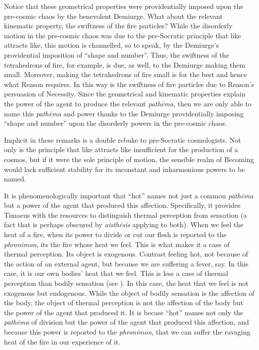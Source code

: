 Notice that these geometrical properties were providentially imposed upon the pre-cosmic chaos by the benevolent Demiurge. What about the relevant kinematic property, the swiftness of the fire particles? While the disorderly motion in the pre-cosmic chaos was due to the pre-Socratic principle that like attracts like, this motion is channelled, so to speak, by the Demiurge's providential imposition of ``shape and number''. Thus, the swiftness of the tetrahedrons of fire, for example, is due, as well, to the Demiurge making them small. Moreover, making the tetrahedrons of fire small is for the best and hence what Reason requires. In this way is the swiftness of fire particles due to Reason's persuasion of Necessity. Since the geometrical and kinematic properties explain the power of the agent to produce the relevant \emph{pathēma}, then we are only able to name this \emph{pathēma} and power thanks to the Demiurge providentially imposing ``shape and number'' upon the disorderly powers in the pre-cosmic chaos.

Implicit in these remarks is a double rebuke to pre-Socratic cosmologists. Not only is the principle that like attracts like insufficient for the production of a cosmos, but if it were the sole principle of motion, the sensible realm of Becoming would lack sufficient stability for its inconstant and inharmonious powers to be named.

It is phenomenologically important that ``hot'' names not just a common \emph{pathēma} but a power of the agent that produced this affection. Specifically, it provides Timaeus with the resources to distinguish thermal perception from sensation (a fact that is perhaps obscured by \emph{aisthēsis} applying to both). When we feel the heat of a fire, when its power to divide or cut our flesh is reported to the \emph{phronimon}, its the fire whose heat we feel. This is what makes it a case of thermal perception. Its object is exogenous. Contrast feeling hot, not because of the action of an external agent, but because we are suffering a fever, say. In this case, it is our own bodies' heat that we feel. This is less a case of thermal perception than bodily sensation (see \citealt{Yrjonsuuri:2008aa}). In this case, the heat that we feel is not exogenous but endogenous. While the object of bodily sensation is the affection of the body, the object of thermal perception is not the affection of the body but the power of the agent that produced it.  It is becase ``hot'' names not only the \emph{pathēma} of division but the power of the agent that produced this affection, and because this power is reported to the \emph{phronimon}, that we can suffer the ravaging heat of the fire in our experience of it.

